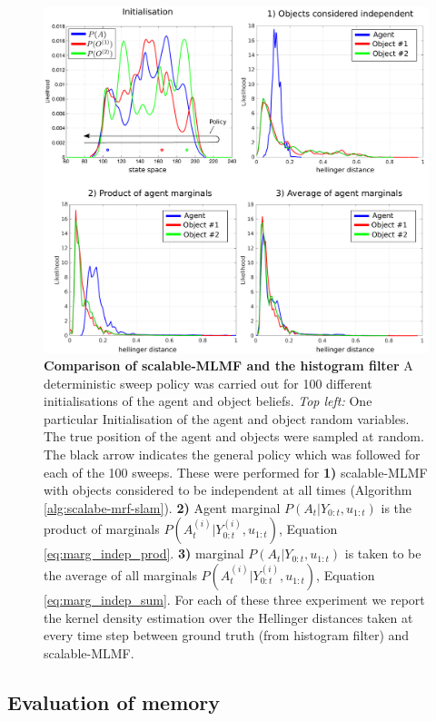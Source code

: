 \begin{figure}
\centering
 \includegraphics[width=\textwidth]{./ch5-MLMF/Figures/Figure13_v2.pdf}
 \caption{\textbf{Comparison of scalable-MLMF and the histogram filter} A deterministic sweep policy was carried out for 100 different initialisations of 
 the agent and object beliefs. \textit{Top left:} One particular Initialisation of the agent and object
 random variables. The true position of the agent and objects were sampled at random. The black arrow indicates the general policy which was 
 followed for each of the 100 sweeps. 
 These were performed for \textbf{1)} scalable-MLMF  with objects considered to be independent at all times (Algorithm \ref{alg:scalabe-mrf-slam}). 
 \textbf{2)} Agent marginal $P(A_t|Y_{0:t},u_{1:t})$ is the product of marginals $P(A^{(i)}_t|Y^{(i)}_{0:t},u_{1:t})$, Equation \ref{eq:marg_indep_prod}. 
 \textbf{3)} marginal $P(A_t|Y_{0:t},u_{1:t})$ is taken to be the average of all marginals $P(A^{(i)}_t|Y^{(i)}_{0:t},u_{1:t})$, Equation \ref{eq:marg_indep_sum}.  For each of these three experiment we report the 
 kernel density estimation over the Hellinger distances taken at every time step between ground truth (from histogram filter) and scalable-MLMF.}
 \label{fig:independence_assumption_test}
\end{figure}

\subsection{Evaluation of memory}

